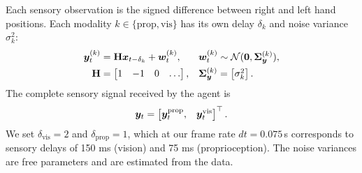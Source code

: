 \documentclass{article}
\begin{document}
Each sensory observation is the signed difference between right and left hand positions. Each modality $k\in\{\text{prop},\text{vis}\}$ has its own delay $\delta_k$ and noise variance $\sigma_k^2$:
\begin{align}
    {\bm y}_t^{(k)} &= \mathbf H {\bm x}_{t-\delta_k} + {\bm w}_t^{(k)},
    && {\bm w}_t^{(k)} \sim \operatorname{\mathcal{N}}(\mathbf 0, \mathbf \Sigma_{\bm y}^{(k)}), \\
    \mathbf H &= \begin{bmatrix} 1 & -1 & 0 & \dots \end{bmatrix},
    && \mathbf \Sigma_{\bm y}^{(k)} = \begin{bmatrix} \sigma_k^2 \end{bmatrix}.
\end{align}
The complete sensory signal received by the agent is
\begin{align}
    {\bm y}_t = \begin{bmatrix}
        {\bm y}_t^{\text{prop}}, & {\bm y}_t^{\text{vis}} 
    \end{bmatrix}^\top.
\end{align}
We set $\delta_{\text{vis}}=2$ and $\delta_{\text{prop}}=1$, which at our frame rate $dt=0.075\,$s corresponds to sensory delays of 150 ms (vision) and 75 ms (proprioception). The noise variances are free parameters and are estimated from the data.
\end{document}
